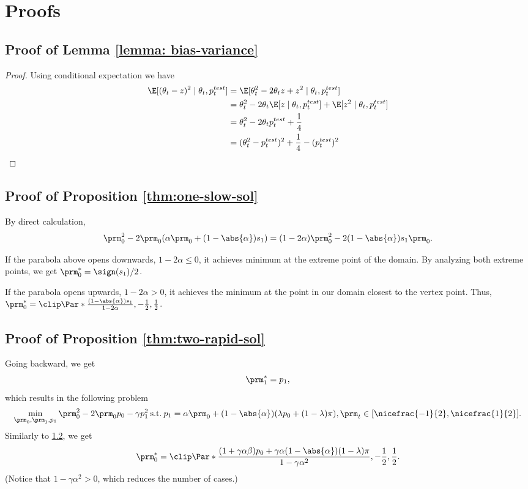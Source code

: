 \section{Proofs}
\label{sec:proofs}

\subsection{Proof of Lemma \ref{lemma: bias-variance}}
\begin{proof}
    Using conditional expectation we have
    \begin{align*}
        \E[(\theta_t - z)^2 \mid \theta_t, p_t^{test}] &= \E[\theta_t^2 - 2
        \theta_t  z + z^2 \mid  \theta_t, p_t^{test}]\\
        &= \theta_t^2 - 2 \theta_t \E[z \mid \theta_t, p_t^{test}] + \E[z^2
        \mid \theta_t, p_t^{test}]\\
        &= \theta_t^2 - 2 \theta_t p_t^{test} + \frac14\\
        &= (\theta_t^2 - p_t^{test})^2 + \frac14 - (p_t^{test})^2
    \end{align*}
\end{proof}

\subsection{Proof of Proposition \ref{thm:one-slow-sol}}
\label{sec:proof-one-slow-sol}

By direct calculation,
\[
    \prm_0^2 - 2 \prm_0 (\alpha \prm_0 + (1 - \abs{\alpha}) s_1) = (1 - 2 \alpha) \prm_0^2
    - 2 (1 - \abs{\alpha}) s_1 \prm_0.
\]

If the parabola above opens downwards, $1 - 2 \alpha \le 0$, it achieves
minimum at the extreme point of the domain. By analyzing both extreme points,
we get $\prm^*_0 = \sign(s_1) / 2$.

If the parabola opens upwards, $1 - 2 \alpha > 0$, it achieves the minimum at
the point in our domain closest to the vertex point. Thus, $\prm^*_0 =
\clip\Par*{\frac{(1 - \abs{\alpha}) s_1}{1 - 2 \alpha}, -\frac{1}{2},
\frac{1}{2}}$.

\subsection{Proof of Proposition \ref{thm:two-rapid-sol}}
\label{sec:proof-two-rapid-sol}

Going backward, we get
\[
    \prm^*_1 = p_1,
\]
which results in the following problem
\[
    \min_{\prm_0, \prm_1, p_1} \prm_0^2 - 2 \prm_0 p_0 - \gamma p_1^2 \:
    \text{s.t.} \: p_1 = \alpha \prm_0 + (1 - \abs{\alpha}) (\lambda p_0 + (1 -
    \lambda) \pi), \prm_t \in [\nicefrac{-1}{2}, \nicefrac{1}{2}].
\]
Similarly to \cref{sec:proof-one-slow-sol}, we get
\[
    \prm^*_0 = \clip\Par*{\frac{(1 + \gamma \alpha \beta)
    p_0 + \gamma \alpha (1 - \abs{\alpha}) (1 - \lambda) \pi}{1 - \gamma
    \alpha^2}, -\frac{1}{2}, \frac{1}{2}}.
\]
(Notice that $1 - \gamma \alpha^2 > 0$, which reduces the number of cases.)




